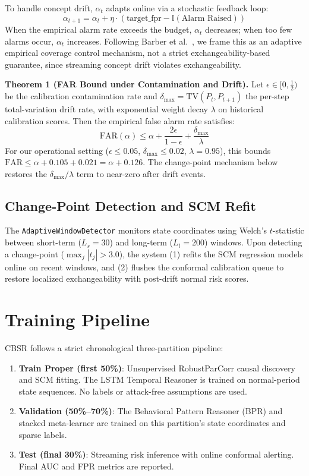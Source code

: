To handle concept drift, $\alpha_t$ adapts online via a stochastic feedback loop:
\begin{equation}
\alpha_{t+1} = \alpha_t + \eta \cdot (\text{target\_fpr} - \mathbb{I}(\text{Alarm Raised}))
\end{equation}
When the empirical alarm rate exceeds the budget, $\alpha_t$ decreases; when too few alarms
occur, $\alpha_t$ increases. Following Barber et al.~\cite{barber2023conformal}, we frame this
as an adaptive empirical coverage control mechanism, not a strict exchangeability-based guarantee,
since streaming concept drift violates exchangeability.

\textbf{Theorem 1 (FAR Bound under Contamination and Drift).} Let $\epsilon \in [0, \tfrac{1}{2})$
be the calibration contamination rate and $\delta_{\max} = \text{TV}(P_t, P_{t+1})$ the
per-step total-variation drift rate, with exponential weight decay $\lambda$ on historical
calibration scores. Then the empirical false alarm rate satisfies:
\begin{equation}
\text{FAR}(\alpha) \leq \alpha + \frac{2\epsilon}{1-\epsilon} + \frac{\delta_{\max}}{\lambda}
\end{equation}
For our operational setting ($\epsilon \leq 0.05$, $\delta_{\max} \leq 0.02$, $\lambda = 0.95$),
this bounds $\text{FAR} \leq \alpha + 0.105 + 0.021 = \alpha + 0.126$. The change-point
mechanism below restores the $\delta_{\max}/\lambda$ term to near-zero after drift events.

\subsection{Change-Point Detection and SCM Refit}

The \texttt{AdaptiveWindowDetector} monitors state coordinates using Welch's $t$-statistic
between short-term ($L_s = 30$) and long-term ($L_l = 200$) windows. Upon detecting a
change-point ($\max_j |t_j| > 3.0$), the system (1) refits the SCM regression models online
on recent windows, and (2) flushes the conformal calibration queue to restore localized
exchangeability with post-drift normal risk scores.


\section{Training Pipeline}

CBSR follows a strict chronological three-partition pipeline:
\begin{enumerate}
\item \textbf{Train Proper (first 50\%)}: Unsupervised RobustParCorr causal discovery and SCM
    fitting. The LSTM Temporal Reasoner is trained on normal-period state sequences. No labels
    or attack-free assumptions are used.
\item \textbf{Validation (50\%--70\%)}: The Behavioral Pattern Reasoner (BPR) and stacked
    meta-learner are trained on this partition's state coordinates and sparse labels.
\item \textbf{Test (final 30\%)}: Streaming risk inference with online conformal alerting.
    Final AUC and FPR metrics are reported.
\end{enumerate}
